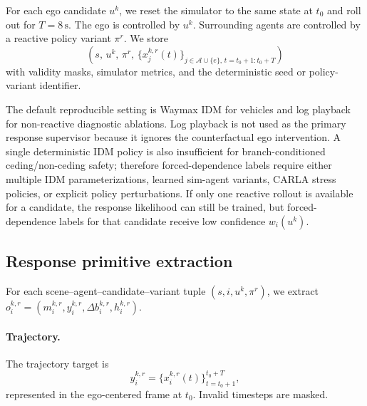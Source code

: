 \documentclass[10pt]{article}
\newcommand{\cA}{\mathcal{A}}
\begin{document}
For each ego candidate \(u^k\), we reset the simulator to the same state at \(t_0\) and roll out for \(T=8\,\mathrm{s}\). The ego is controlled by \(u^k\). Surrounding agents are controlled by a reactive policy variant \(\pi^r\). We store
\[
\left(
s,\,
u^k,\,
\pi^r,\,
\{x_j^{k,r}(t)\}_{j\in\cA\cup\{e\},\,t=t_0+1:t_0+T}
\right)
\]
with validity masks, simulator metrics, and the deterministic seed or policy-variant identifier.

The default reproducible setting is Waymax IDM for vehicles and log playback for non-reactive diagnostic ablations. Log playback is not used as the primary response supervisor because it ignores the counterfactual ego intervention. A single deterministic IDM policy is also insufficient for branch-conditioned ceding/non-ceding safety; therefore forced-dependence labels require either multiple IDM parameterizations, learned sim-agent variants, CARLA stress policies, or explicit policy perturbations. If only one reactive rollout is available for a candidate, the response likelihood can still be trained, but forced-dependence labels for that candidate receive low confidence \(w_i(u^k)\).

\subsection{Response primitive extraction}
\label{app:response_extraction}

For each scene--agent--candidate--variant tuple \((s,i,u^k,\pi^r)\), we extract \(o_i^{k,r}=(m_i^{k,r},y_i^{k,r},\Delta b_i^{k,r},h_i^{k,r})\).

\paragraph{Trajectory.}
The trajectory target is
\[
y_i^{k,r}=\{x_i^{k,r}(t)\}_{t=t_0+1}^{t_0+T},
\]
represented in the ego-centered frame at \(t_0\). Invalid timesteps are masked.
\end{document}
